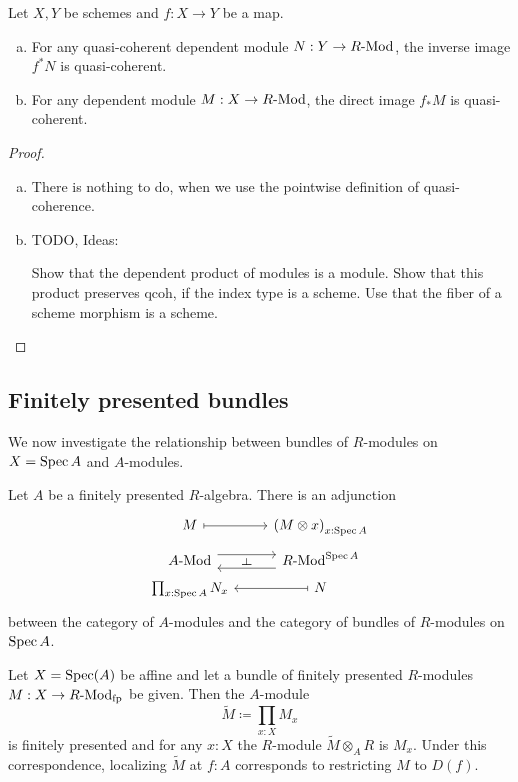 \begin{theorem}%
  \label{pullback-push-forward-qcoh}
  Let $X,Y$ be schemes and $f:X\to Y$ be a map.
  \begin{enumerate}[(a)]
  \item For any quasi-coherent dependent module $N:Y\to R\text{-}\mathrm{Mod}$,
    the inverse image $f^*N$ is quasi-coherent.
  \item For any dependent module $M:X\to R\text{-}\mathrm{Mod}$,
    the direct image $f_*M$ is quasi-coherent.
  \end{enumerate}
\end{theorem}

\begin{proof}
  \begin{enumerate}[(a)]
  \item There is nothing to do, when we use the pointwise definition of quasi-coherence. 
  \item TODO, Ideas:

    Show that the dependent product of modules is a module.
    Show that this product preserves qcoh, if the index type is a scheme.
    Use that the fiber of a scheme morphism is a scheme.
  \end{enumerate}
\end{proof}

\subsection{Finitely presented bundles}

We now investigate the relationship between bundles of $R$-modules on $X = \operatorname{Spec} A$
and $A$-modules.

\begin{proposition}
  Let $A$ be a finitely presented $R$-algebra.
  There is an adjunction
  \[ \begin{tikzcd}[row sep=tiny]
    M \ar[r, mapsto] & {(M \otimes x)}_{x : \Spec A} \\
    \Mod{A} \ar[r, shift left=2] \ar[r, phantom, "\rotatebox{90}{$\vdash$}"] &
    \Mod{R}^{\Spec A} \ar[l, shift left=2] \\
    \prod_{x : \Spec A} N_x & N \ar[l, mapsto]
  \end{tikzcd} \]
  between the category of $A$-modules
  and the category of bundles of $R$-modules on $\operatorname{Spec} A$.
\end{proposition}

\begin{theorem}%
  \label{fp-module}
  Let $X=\operatorname{Spec}(A)$ be affine and
  let a bundle of finitely presented $R$-modules $M : X\to R\text{-}\mathrm{Mod}_{\text{fp}}$ be given.
  Then the $A$-module
  \[ \tilde{M}\coloneqq\prod_{x:X}M_x \]
  is finitely presented and for any $x:X$ the $R$-module $\tilde{M}\otimes_A R$ is $M_x$.
  Under this correspondence, localizing $\tilde{M}$ at $f:A$ corresponds to restricting $M$ to $D(f)$.
\end{theorem}

